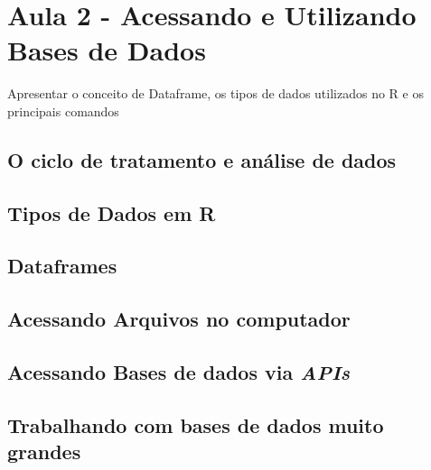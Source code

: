 \chapter{Aula 2 - Acessando e Utilizando Bases de Dados}

Apresentar o conceito de Dataframe, os tipos de dados utilizados no R e os principais comandos  

\section{O ciclo de tratamento e análise de dados}

\section{Tipos de Dados em R}

\section{Dataframes}

\section{Acessando Arquivos no computador}


\section{Acessando Bases de dados via \textit{APIs}}

\section{Trabalhando com bases de dados muito grandes}
